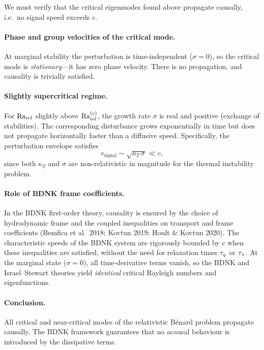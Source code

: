 \begin{causalitycheck}
We must verify that the critical eigenmodes found above propagate
causally, i.e.\ no signal speed exceeds $c$.

\paragraph{Phase and group velocities of the critical mode.}
At marginal stability the perturbation is time-independent
($\sigma = 0$), so the critical mode is \emph{stationary}---it has
zero phase velocity. There is no propagation, and causality is
trivially satisfied.

\paragraph{Slightly supercritical regime.}
For $\mathrm{Ra}_{\mathrm{rel}}$ slightly above $\mathrm{Ra}_{\mathrm{rel}}^{(c)}$, the growth rate $\sigma$
is real and positive (exchange of stabilities). The corresponding
disturbance grows exponentially in time but does not propagate
horizontally faster than a diffusive speed. Specifically, the
perturbation envelope satisfies
\[
v_{\mathrm{signal}} \sim \sqrt{\kappa_{T}\,\sigma}
  \ll c,
\]
since both $\kappa_{T}$ and $\sigma$ are non-relativistic in magnitude
for the thermal instability problem.

\paragraph{Role of BDNK frame coefficients.}
In the BDNK first-order theory, causality is ensured by the choice of
hydrodynamic frame and the coupled inequalities on transport and frame
coefficients (Bemfica et al.\ 2018; Kovtun 2019; Hoult \& Kovtun 2020).
The characteristic speeds of the BDNK system are rigorously bounded by
$c$ when these inequalities are satisfied, without the need for
relaxation times $\tau_{q}$ or $\tau_{\pi}$.  At the marginal state
($\sigma = 0$), all time-derivative terms vanish, so the BDNK and
Israel--Stewart theories yield \emph{identical} critical Rayleigh
numbers and eigenfunctions.

\paragraph{Conclusion.}
All critical and near-critical modes of the relativistic B\'enard
problem propagate causally. The BDNK framework guarantees
that no acausal behaviour is introduced by the dissipative terms.
\end{causalitycheck}


